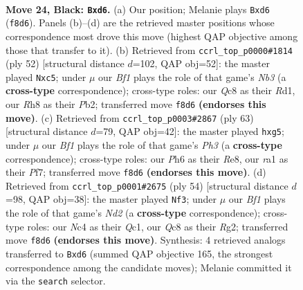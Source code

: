 \documentclass[11pt]{article}
\begin{document}
\clearpage

\begin{figure}[p]\centering
\begin{subfigure}{0.46\textwidth}\centering
\resizebox{\linewidth}{!}{%
\newchessgame
\chessboard[
  setfen={r1qk1b1r/p4pp1/3P1n1p/5P1P/B1n2Q1R/8/6p1/R1B1K1N1 b Q - 1 24},
  showmover=false,
  pgfstyle=straightmove, color=movearrow, markmove={f8-d6}
]}
\caption{}
\end{subfigure}\hfill
\begin{subfigure}{0.46\textwidth}\centering
\resizebox{\linewidth}{!}{%
\newchessgame
\chessboard[
  setfen={1rbr2k1/6bp/3P1qp1/pBpp1p2/P4P2/1N6/1P1Q2P1/1K1R3R w - - 0 27},
  showmover=false,
  pgfstyle=straightmove, color=movearrow, markmove={b3-c5}
]}
\caption{}
\end{subfigure}
\\[4pt]
\begin{subfigure}{0.46\textwidth}\centering
\resizebox{\linewidth}{!}{%
\newchessgame
\chessboard[
  setfen={r3r1k1/5pp1/2nB3p/1q1p2PP/b1pP4/4PP2/7Q/1BR1R1K1 b - - 0 32},
  showmover=false,
  pgfstyle=straightmove, color=movearrow, markmove={h6-g5}
]}
\caption{}
\end{subfigure}\hfill
\begin{subfigure}{0.46\textwidth}\centering
\resizebox{\linewidth}{!}{%
\newchessgame
\chessboard[
  setfen={1r3r1k/p7/1q3p1P/1p3n1P/2pb1P2/P7/1P1N2R1/1KQR1B2 w - - 2 28},
  showmover=false,
  pgfstyle=straightmove, color=movearrow, markmove={d2-f3}
]}
\caption{}
\end{subfigure}
\caption{\textbf{Move 24, Black: \texttt{Bxd6}.} (a) Our position; Melanie plays \texttt{Bxd6} (\texttt{f8d6}). Panels (b)--(d) are the retrieved master positions whose correspondence most drove this move (highest QAP objective among those that transfer to it). (b) Retrieved from \texttt{ccrl\_top\_p0000\#1814} (ply 52) [structural distance $d$=102, QAP obj=52]: the master played \texttt{Nxc5}; under $\mu$ our \emph{Bf1} plays the role of that game's \emph{Nb3} (a \textbf{cross-type} correspondence); cross-type roles: our \emph{Q}c8 as their \emph{R}d1, our \emph{R}h8 as their \emph{P}b2; transferred move \texttt{f8d6} \textbf{(endorses this move)}. (c) Retrieved from \texttt{ccrl\_top\_p0003\#2867} (ply 63) [structural distance $d$=79, QAP obj=42]: the master played \texttt{hxg5}; under $\mu$ our \emph{Bf1} plays the role of that game's \emph{Ph3} (a \textbf{cross-type} correspondence); cross-type roles: our \emph{P}h6 as their \emph{R}e8, our \emph{r}a1 as their \emph{P}f7; transferred move \texttt{f8d6} \textbf{(endorses this move)}. (d) Retrieved from \texttt{ccrl\_top\_p0001\#2675} (ply 54) [structural distance $d$=98, QAP obj=38]: the master played \texttt{Nf3}; under $\mu$ our \emph{Bf1} plays the role of that game's \emph{Nd2} (a \textbf{cross-type} correspondence); cross-type roles: our \emph{N}c4 as their \emph{Q}c1, our \emph{Q}c8 as their \emph{R}g2; transferred move \texttt{f8d6} \textbf{(endorses this move)}. Synthesis: 4 retrieved analogs transferred to \texttt{Bxd6} (summed QAP objective 165, the strongest correspondence among the candidate moves); Melanie committed it via the \texttt{search} selector.}
\label{fig:thought-m47}
\end{figure}
\end{document}
